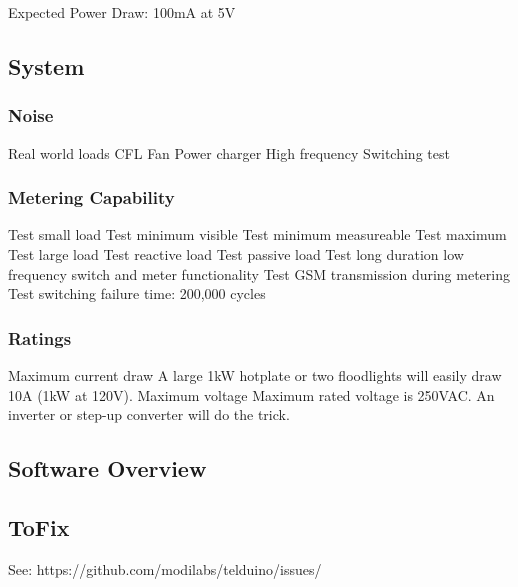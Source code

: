 \documentclass[]{article}
\begin{document}
            Expected Power Draw: 100mA at 5V

    \subsection{System}
    \subsubsection{Noise}
        Real world loads
        CFL
        Fan
        Power charger
        High frequency Switching test

    \subsubsection{Metering Capability}
        Test small load
        Test minimum visible
        Test minimum measureable
        Test maximum
        Test large load
        Test reactive load
        Test passive load
        Test long duration low frequency switch and meter functionality
        Test GSM transmission during metering
        Test switching failure time:
            200,000 cycles
    \subsubsection{Ratings}
        Maximum current draw
            A large 1kW hotplate or two floodlights will easily draw 10A (1kW at 120V).
        Maximum voltage
            Maximum rated voltage is 250VAC. 
            An inverter or step-up converter will do the trick.
    \subsection{Software Overview}
    \subsection{ToFix}
        See: https://github.com/modilabs/telduino/issues/
\end{document}
